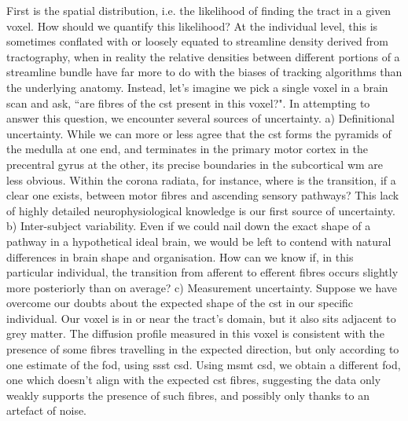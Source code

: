 First is the spatial distribution, i.e. the likelihood of finding the tract in a given voxel.
How should we quantify this likelihood?
At the individual level, this is sometimes conflated with or loosely equated to streamline density derived from tractography, when in reality the relative densities between different portions of a streamline bundle have far more to do with the biases of tracking algorithms than the underlying anatomy.
Instead, let's imagine we pick a single \gls{voxel} in a brain scan and ask, ``are fibres of the \gls{cst} present in this voxel?".
In attempting to answer this question, we encounter several sources of uncertainty.
a) Definitional uncertainty.
While we can more or less agree that the \gls{cst} forms the pyramids of the medulla at one end, and terminates in the primary motor cortex in the precentral gyrus at the other, its precise boundaries in the subcortical \gls{wm} are less obvious.
Within the corona radiata, for instance, where is the transition, if a clear one exists, between motor fibres and ascending sensory pathways?
This lack of highly detailed neurophysiological knowledge is our first source of uncertainty.
b) Inter-subject variability.
Even if we could nail down the exact shape of a pathway in a hypothetical ideal brain, we would be left to contend with natural differences in brain shape and organisation.
How can we know if, in this particular individual, the transition from afferent to efferent fibres occurs slightly more posteriorly than on average?
c) Measurement uncertainty.
Suppose we have overcome our doubts about the expected shape of the \gls{cst} in our specific individual.
Our voxel is in or near the tract's domain, but it also sits adjacent to grey matter.
The diffusion profile measured in this voxel is consistent with the presence of some fibres travelling in the expected direction, but only according to one estimate of the \gls{fod}, using \gls{ssst} \gls{csd}.
Using \gls{msmt} \gls{csd}, we obtain a different \gls{fod}, one which doesn't align with the expected \gls{cst} fibres, suggesting the data only weakly supports the presence of such fibres, and possibly only thanks to an artefact of noise.

